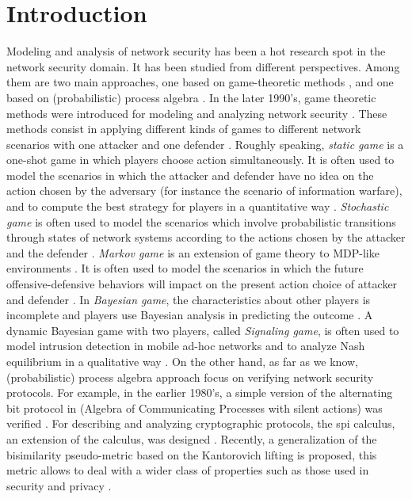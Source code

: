 \documentclass{acm_proc_article-sp}
\begin{document}
\section{Introduction}
Modeling and analysis of network security has been a hot research spot in the network security domain.
It has been studied from different perspectives.  Among them are two main approaches, one based on game-theoretic methods \cite{martin},  and
one based on (probabilistic) process algebra \cite{robin,rob,yuxin}.
In the later 1990's, game theoretic methods were introduced for modeling and analyzing network security \cite{syverson}.
These methods consist in applying different kinds of games to different network scenarios with one attacker and one defender \cite{sankardas}.
Roughly speaking,
{\it static game} is a one-shot game in which players choose action simultaneously.
It is often used to model the scenarios in which the attacker and defender have no idea on the action chosen by the adversary (for instance the scenario of information warfare),
and to compute the best strategy for players in a quantitative way \cite{jormakka}.
{\it Stochastic game} is often used to model the scenarios which involve probabilistic transitions through states of network systems according to the actions chosen by the attacker and the defender \cite{nguyen,klye}.
{\it Markov game} is an extension of game theory to MDP-like environments \cite{vander}.
It is often used to model the scenarios in which the future offensive-defensive behaviors will impact on the present action choice of attacker and defender \cite{xiaolin}.
In {\it Bayesian game}, the characteristics about other players is incomplete and players use Bayesian analysis in predicting the outcome \cite{Harsanyi}.
A dynamic Bayesian game with two players, called {\it Signaling game}, is often used to model intrusion detection in mobile ad-hoc networks and to analyze Nash equilibrium in a qualitative way \cite{patcha}.
On the other hand, as far as we know, (probabilistic) process algebra approach focus on verifying network security protocols.
For example, in the earlier 1980's, a simple version of the alternating bit protocol
in  (Algebra of Communicating Processes with silent actions) was verified \cite{bergstra}.
For describing and analyzing cryptographic protocols, the spi calculus, an extension of the  calculus, was designed \cite{abadi}.
Recently, a generalization of the bisimilarity pseudo-metric based on the Kantorovich lifting is proposed,
this metric allows to deal with a wider class of properties such as those used in security and privacy \cite{lilixu}.
\end{document}

